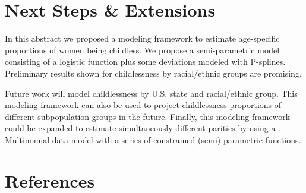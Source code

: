 \documentclass[
  11pt,
  letterpaper,
]{article}
\begin{document}
\hypertarget{next-steps-extensions}{%
\section{Next Steps \& Extensions}\label{next-steps-extensions}}

In this abstract we proposed a modeling framework to estimate age-specific proportions of women being childless. We propose a semi-parametric model consisting of a logistic function plus some deviations modeled with P-splines. Preliminary results shown for childlessness by racial/ethnic groups are promising.

Future work will model childlessness by U.S. state and racial/ethnic group. This modeling framework can also be used to project childlessness proportions of different subpopulation groups in the future. Finally, this modeling framework could be expanded to estimate simultaneously different parities by using a Multinomial data model with a series of constrained (semi)-parametric functions.

\newpage

\hypertarget{references}{%
\section*{References}\label{references}}
\end{document}
